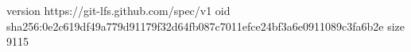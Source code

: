 version https://git-lfs.github.com/spec/v1
oid sha256:0e2c619df49a779d91179f32d64fb087c7011efce24bf3a6e0911089c3fa6b2e
size 9115
